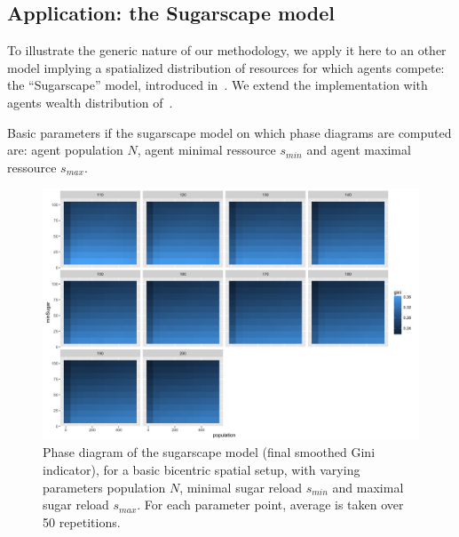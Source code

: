 \documentclass[a4paper,12pt]{article}
\begin{document}
\subsection{Application: the Sugarscape model}

To illustrate the generic nature of our methodology, we apply it here to an other model implying a spatialized distribution of resources for which agents compete: the ``Sugarscape'' model, introduced in~\cite{epstein1996growing}. We extend the implementation with agents wealth distribution of~\cite{li2009netlogo}.

Basic parameters if the sugarscape model on which phase diagrams are computed are: agent population $N$, agent minimal ressource $s_{min}$ and agent maximal ressource $s_{max}$.


\begin{figure}
\centering
\includegraphics[width=\textwidth]{figures/fixed_phase_diagram}
\caption{Phase diagram of the sugarscape model (final smoothed Gini indicator), for a basic bicentric spatial setup, with varying parameters population $N$, minimal sugar reload $s_{min}$ and maximal sugar reload $s_{max}$. For each parameter point, average is taken over 50 repetitions.}
\label{fig:sugarscape-phasediagram}
\end{figure}
\end{document}
